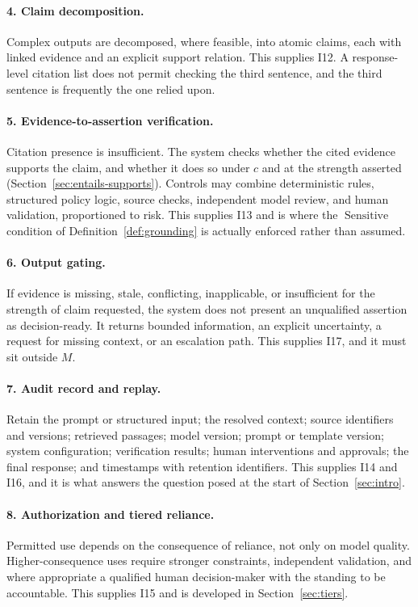 \documentclass[11pt]{article}
\newcommand{\Sensitive}{\operatorname{Sensitive}}
\theoremstyle{plain}
\theoremstyle{definition}
\begin{document}
\paragraph{4. Claim decomposition.} Complex outputs are decomposed, where feasible,
into atomic claims, each with linked evidence and an explicit support relation. This
supplies I12. A response-level citation list does not permit checking the third
sentence, and the third sentence is frequently the one relied upon.

\paragraph{5. Evidence-to-assertion verification.} Citation presence is
insufficient. The system checks whether the cited evidence supports the claim, and
whether it does so under $c$ and at the strength asserted
(Section~\ref{sec:entails-supports}). Controls may combine deterministic rules,
structured policy logic, source checks, independent model review, and human
validation, proportioned to risk. This supplies I13 and is where the
$\Sensitive$ condition of Definition~\ref{def:grounding} is actually enforced
rather than assumed.

\paragraph{6. Output gating.} If evidence is missing, stale, conflicting,
inapplicable, or insufficient for the strength of claim requested, the system does
not present an unqualified assertion as decision-ready. It returns bounded
information, an explicit uncertainty, a request for missing context, or an
escalation path. This supplies I17, and it must sit outside $M$.

\paragraph{7. Audit record and replay.} Retain the prompt or structured input; the
resolved context; source identifiers and versions; retrieved passages; model
version; prompt or template version; system configuration; verification results;
human interventions and approvals; the final response; and timestamps with
retention identifiers. This supplies I14 and I16, and it is what answers the
question posed at the start of Section~\ref{sec:intro}.

\paragraph{8. Authorization and tiered reliance.} Permitted use depends on the
consequence of reliance, not only on model quality. Higher-consequence uses require
stronger constraints, independent validation, and where appropriate a qualified
human decision-maker with the standing to be accountable. This supplies I15 and is
developed in Section~\ref{sec:tiers}.
\end{document}
